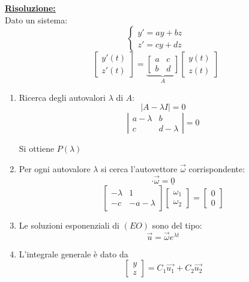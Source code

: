 \underline{\textbf{Risoluzione:}}\\
Dato un sistema:
\[
    \begin{cases}
        y' = ay + bz \\
        z' = cy + dz
    \end{cases}
\]
\[
    \left[  
        \begin{matrix}
            y'(t) \\ z'(t)
        \end{matrix} 
    \right] = \underbrace{\left[
        \begin{matrix}
            a & c \\ b & d
        \end{matrix}
    \right]}_{A} \left[
        \begin{matrix}
            y(t) \\ z(t)
        \end{matrix}
    \right]
\]
\begin{enumerate}
    \item Ricerca degli autovalori $\lambda$ di $A$:
    \begin{equation}
        |A -\lambda I|=0
    \end{equation}
    \[
        \left| \begin{matrix}
            a-\lambda & b \\
            c & d-\lambda 
        \end{matrix} \right| = 0
    \]

    Si ottiene $P(\lambda)$

    \item Per ogni autovalore $\lambda$ si cerca l'autovettore $\vec{\omega}$ corrispondente:
    \begin{equation}
        [A - \lambda I] \cdot \vec{\omega} = \underline{0}
    \end{equation}
    \[
        \left[ \begin{matrix}
            -\lambda & 1 \\
            -c & -a-\lambda 
        \end{matrix} \right] \left[ \begin{matrix}
            \omega_1 \\ \omega_2 
        \end{matrix} \right] = \left[ \begin{matrix}
            0 \\ 0
        \end{matrix}\right]
    \]
    \item Le soluzioni esponenziali di $(EO)$ sono del tipo:
    \begin{equation}
        \vec{u} = \vec{\omega}  e^{\lambda t}
    \end{equation}
    \item L'integrale generale è dato da
    \begin{equation}
        \left[
            \begin{matrix}
                y \\ z
            \end{matrix}
        \right] = C_1 \vec{u_1} + C_2 \vec{u_2}
    \end{equation}
\end{enumerate}